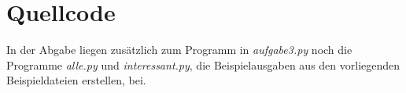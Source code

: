 \documentclass[12pt]{article}
\begin{document}
\section{Quellcode}
In der Abgabe liegen zusätzlich zum Programm in \textit{aufgabe3.py} noch die Programme \textit{alle.py} und \textit{interessant.py}, die Beispielausgaben aus den vorliegenden Beispieldateien erstellen, bei.
\inputminted[numbersep=5pt, tabsize=2, label=aufgabe1.py, breaklines, breaksymbolleft={}, linenos=true]{python3}{/home/nicholas/informatik/bwinf/Runde2/Aufgabe3/Abgabe/Aufgabe3/aufgabe3.py}
\end{document}

